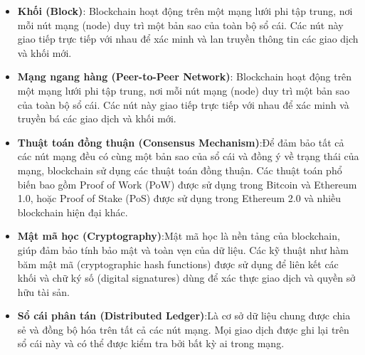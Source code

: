 \begin{itemize}
    \item \textbf{Khối (Block)}: Blockchain hoạt động trên một mạng lưới phi tập trung, nơi mỗi nút mạng (node) duy trì một bản sao của toàn bộ sổ cái. Các nút này giao tiếp trực tiếp với nhau để xác minh và lan truyền thông tin các giao dịch và khối mới.
    \item \textbf{Mạng ngang hàng (Peer-to-Peer Network)}: Blockchain hoạt động trên một mạng lưới phi tập trung, nơi mỗi nút mạng (node) duy trì một bản sao của toàn bộ sổ cái. Các nút này giao tiếp trực tiếp với nhau để xác minh và truyền bá các giao dịch và khối mới.
    \item \textbf{Thuật toán đồng thuận (Consensus Mechanism)}:Để đảm bảo tất cả các nút mạng đều có cùng một bản sao của sổ cái và đồng ý về trạng thái của mạng, blockchain sử dụng các thuật toán đồng thuận. Các thuật toán phổ biến bao gồm Proof of Work (PoW) được sử dụng trong Bitcoin và Ethereum 1.0, hoặc Proof of Stake (PoS) được sử dụng trong Ethereum 2.0 và nhiều blockchain hiện đại khác.
    \item \textbf{Mật mã học (Cryptography)}:Mật mã học là nền tảng của blockchain, giúp đảm bảo tính bảo mật và toàn vẹn của dữ liệu. Các kỹ thuật như hàm băm mật mã (cryptographic hash functions) được sử dụng để liên kết các khối và chữ ký số (digital signatures) dùng để xác thực giao dịch và quyền sở hữu tài sản.
    \item \textbf{Sổ cái phân tán (Distributed Ledger)}:Là cơ sở dữ liệu chung được chia sẻ và đồng bộ hóa trên tất cả các nút mạng. Mọi giao dịch được ghi lại trên sổ cái này và có thể được kiểm tra bởi bất kỳ ai trong mạng.
\end{itemize}

